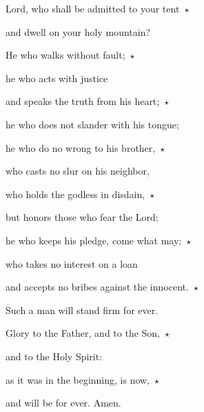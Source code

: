 \noindent Lord, who shall be admitted to your tent~$\star$~\nopagebreak

and dwell on your holy mountain?

\noindent He who walks without fault;~$\star$~\nopagebreak

he who acts with justice

\noindent and speaks the truth from his heart;~$\star$~\nopagebreak

he who does not slander with his tongue;

\noindent he who do no wrong to his brother,~$\star$~\nopagebreak

who casts no slur on his neighbor,

\noindent who holds the godless in disdain,~$\star$~\nopagebreak

but honors those who fear the Lord;

\noindent he who keeps his pledge, come what may;~$\star$~\nopagebreak

who takes no interest on a loan

\noindent and accepts no bribes against the innocent.~$\star$~\nopagebreak

Such a man will stand firm for ever.

\noindent Glory to the Father, and to the Son,~$\star$~\nopagebreak

and to the Holy Spirit:

\noindent as it was in the beginning, is now,~$\star$~\nopagebreak

and will be for ever. Amen.
